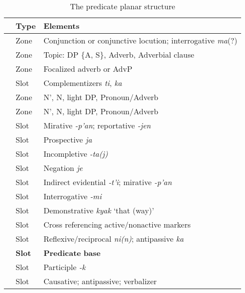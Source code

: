 \documentclass[output=paper]{langscibook}
\begin{document}
\begin{longtable}{Slp{9cm}}
    \caption{The predicate planar structure}
    \label{tab:chor:key:1}
    \centering
    \endfirsthead 
    \endhead
    \lsptoprule
     & {\bfseries Type} & {\bfseries Elements}\\ \midrule
    \label{chovpos:conjunct1}   & Zone & Conjunction or conjunctive locution; interrogative \textit{ma}(?)\\
    \label{chovpos:top2} & Zone & Topic: DP \{A, S\}, Adverb, Adverbial clause\\
    \label{chovpos:foc3}  & Zone & Focalized adverb or AdvP\\
    \label{chovpos:complementizer4} & Slot & Complementizers \textit{ti}, \textit{ka} \\
    \label{chovpos:lightDP5}     & Zone & N', N, light DP, Pronoun/Adverb\\
    \label{chovpos:lightDP6}     & Zone & N', N, light DP, Pronoun/Adverb\\
    \label{chovpos:mirativereportative7}     & Slot & Mirative \textit{-p'an}; reportative \textit{-jen} \\
    \label{chovpos:prospectiveja8}     & Slot & Prospective \textit{ja}\\
    \label{chovpos:incompletive9}     & Slot & Incompletive \textit{-ta(j)}\\
    \label{chovpos:negationje10}     & Slot & Negation \textit{je}\\
    \label{chovpos:indirectevidentialmirative11}     & Slot & Indirect evidential \textit{-t'i}; mirative \textit{-p'an}\\
    \label{chovpos:interrogativemi12}     & Slot & Interrogative \textit{-mi}\\
    \label{chovpos:kyak13}     & Slot & Demonstrative \textit{kyak} `that (way)'\\
    \label{chovpos:activenonactive14}     & Slot & Cross referencing active/nonactive markers\\
    \label{chovpos:rflxantipassive15}     & Slot & Reflexive/reciprocal \textit{ni(n)}; antipassive \textit{ka}\\
    \label{chovpos:predbase16}     & \textbf{Slot} & \textbf{Predicate} \textbf{base}\\
    \label{chovpos:ptcp17}     & Slot & Participle \textit{{}-k}\\
    \label{chovpos:antipassvblz18}     & Slot & Causative; antipassive; verbalizer\\

\end{longtable}
\end{document}
